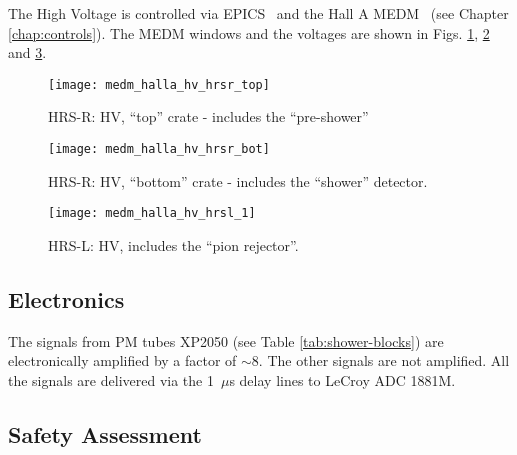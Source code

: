 {The High Voltage is controlled via EPICS~\cite{EPICSwww} and the 
Hall A MEDM~\cite{MEDMwww} (see Chapter \ref{chap:controls}).
The MEDM windows and the voltages are shown in Figs. \ref{fig:hrs-det-hv-hrsr-top},
\ref{fig:hrs-det-hv-hrsr-bot} and \ref{fig:hrs-det-hv-hrsl}.
\begin{figure}
\begin{center}
  \texttt{[image: medm\_halla\_hv\_hrsr\_top]}
\end{center}
\caption[Detectors: Shower HRS-R HV top]{
  HRS-R: HV, ``top'' crate - includes the ``pre-shower''} 
\label{fig:hrs-det-hv-hrsr-top}
\end{figure}

\begin{figure}
\begin{center}
  \texttt{[image: medm\_halla\_hv\_hrsr\_bot]}
\end{center}
\caption[Detectors: Shower HRS-R HV top]{
  HRS-R: HV, ``bottom'' crate - includes the ``shower'' detector.} 
\label{fig:hrs-det-hv-hrsr-bot}
\end{figure}

\begin{figure}
\begin{center}
  \texttt{[image: medm\_halla\_hv\_hrsl\_1]}
\end{center}
\caption[Detectors: Shower HRS-L HV]{
  HRS-L: HV, includes the ``pion rejector''.} 
\label{fig:hrs-det-hv-hrsl}
\end{figure}

\subsection{Electronics}

The signals from PM tubes XP2050 (see Table \ref{tab:shower-blocks})
are electronically amplified by a factor of $\sim$8. The other signals
are not amplified. All the signals
are delivered via the 1~$\mu$s delay lines to LeCroy ADC 1881M.

} %

\begin{safetyen}{10}{10}
\section{Safety Assessment}
\end{safetyen}

  
